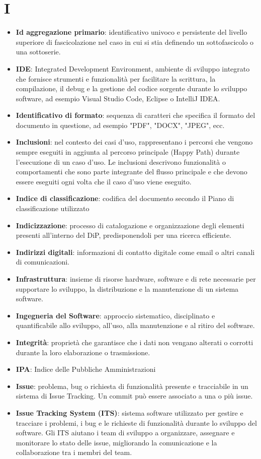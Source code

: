 \documentclass[a4paper,12pt]{article}
\begin{document}
\section{I}
\begin{itemize}
    \item \textbf{Id aggregazione primario}: identificativo univoco e persistente del livello superiore di fascicolazione nel caso in cui si stia definendo un sottofascicolo o una sottoserie.
    \item \textbf{IDE}: Integrated Development Environment, ambiente di sviluppo integrato che fornisce strumenti e funzionalità per facilitare la scrittura, la compilazione, il debug e la gestione del codice sorgente durante lo sviluppo software, ad esempio Visual Studio Code, Eclipse o IntelliJ IDEA.
    \item \textbf{Identificativo di formato}: sequenza di caratteri che specifica il formato del documento in questione, ad esempio "PDF", "DOCX", "JPEG", ecc.
    \item \textbf{Inclusioni}: nel contesto dei casi d'uso, rappresentano i percorsi che vengono sempre eseguiti in aggiunta al percorso principale (Happy Path) durante l'esecuzione di un caso d'uso. Le inclusioni descrivono funzionalità o comportamenti che sono parte integrante del flusso principale e che devono essere eseguiti ogni volta che il caso d'uso viene eseguito.
    \item \textbf{Indice di classificazione}: codifica del documento secondo il Piano di classificazione utilizzato
    \item \textbf{Indicizzazione}: processo di catalogazione e organizzazione degli elementi presenti all'interno del DiP, predisponendoli per una ricerca efficiente.
    \item \textbf{Indirizzi digitali}: informazioni di contatto digitale come email o altri canali di comunicazioni.
    \item \textbf{Infrastruttura}: insieme di risorse hardware, software e di rete necessarie per supportare lo sviluppo, la distribuzione e la manutenzione di un sistema software.
    \item \textbf{Ingegneria del Software}: approccio sistematico, disciplinato e quantificabile allo sviluppo, all'uso, alla manutenzione e al ritiro del software.
    \item \textbf{Integrità}: proprietà che garantisce che i dati non vengano alterati o corrotti durante la loro elaborazione o trasmissione.
    \item \textbf{IPA}: Indice delle Pubbliche Amministrazioni
    \item \textbf{Issue}: problema, bug o richiesta di funzionalità presente e tracciabile in un sistema di Issue Tracking. Un commit può essere associato a una o più issue.
    \item \textbf{Issue Tracking System (ITS)}: sistema software utilizzato per gestire e tracciare i problemi, i bug e le richieste di funzionalità durante lo sviluppo del software. Gli ITS aiutano i team di sviluppo a organizzare, assegnare e monitorare lo stato delle issue, migliorando la comunicazione e la collaborazione tra i membri del team.
\end{itemize}
\end{document}
